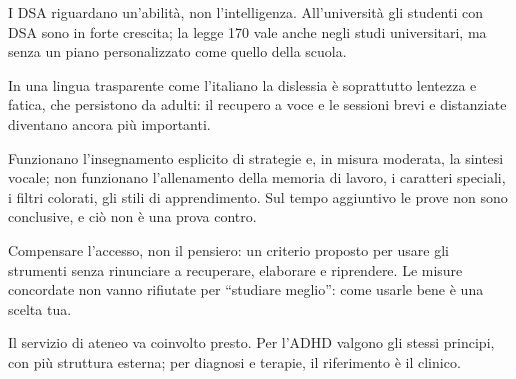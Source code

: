 \begin{sintesi}
  \item I DSA riguardano un'abilità, non l'intelligenza. All'università
        gli studenti con DSA sono in forte crescita; la legge 170 vale
        anche negli studi universitari, ma senza un piano personalizzato come quello della scuola.
  \item In una lingua trasparente come l'italiano la dislessia è
        soprattutto lentezza e fatica, che persistono da adulti: il
        recupero a voce e le sessioni brevi e distanziate diventano
        ancora più importanti.
  \item Funzionano l'insegnamento esplicito di strategie e, in misura
        moderata, la sintesi vocale; non funzionano l'allenamento della
        memoria di lavoro, i caratteri speciali, i filtri colorati, gli
        stili di apprendimento. Sul tempo aggiuntivo le prove non sono conclusive, e ciò non è una prova contro.
  \item Compensare l'accesso, non il pensiero: un criterio proposto per
        usare gli strumenti senza rinunciare a recuperare, elaborare e
        riprendere. Le misure concordate non vanno rifiutate per \enquote{studiare meglio}: come usarle bene è una scelta tua.
  \item Il servizio di ateneo va coinvolto presto. Per l'ADHD valgono gli
        stessi principi, con più struttura esterna; per diagnosi e
        terapie, il riferimento è il clinico.
\end{sintesi}

\finecapitolo
